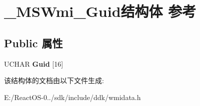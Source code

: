 \hypertarget{struct___m_s_wmi___guid}{}\section{\+\_\+\+M\+S\+Wmi\+\_\+\+Guid结构体 参考}
\label{struct___m_s_wmi___guid}
\subsection*{Public 属性}
\begin{DoxyCompactItemize}
\item 
\mbox{\label{struct___m_s_wmi___guid_af6fb324762ad9763d26739bacd6922d3}} 
U\+C\+H\+AR {\bfseries Guid} \mbox{[}16\mbox{]}
\end{DoxyCompactItemize}


该结构体的文档由以下文件生成\+:\begin{DoxyCompactItemize}
\item 
E\+:/\+React\+O\+S-\/0../sdk/include/ddk/wmidata.\+h\end{DoxyCompactItemize}
